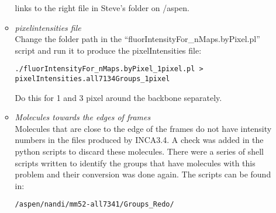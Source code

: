 \documentclass[11pt]{article}
\begin{document}
\begin{enumerate}
\begin{itemize}
\begin{verbatim}
\end{verbatim}
links to the right file in Steve's folder on /aspen.
\item \emph{pixelintensities file} \\
Change the folder path in the ``fluorIntensityFor\_nMaps.byPixel.pl'' script and run it to produce the pixelIntensities file:
\begin{verbatim}
./fluorIntensityFor_nMaps.byPixel_1pixel.pl > pixelIntensities.all7134Groups_1pixel
\end{verbatim}
Do this for 1 and 3 pixel around the backbone separately. 
\item \emph{Molecules towards the edges of frames} \\
Molecules that are close to the edge of the frames do not have intensity numbers in the files produced by INCA3.4. A check was added in the python scripts to discard these molecules. There were a series of shell scripts written to identify the groups that have molecules with this problem and their conversion was done again. The scripts can be found in:
\begin{verbatim}
/aspen/nandi/mm52-all7341/Groups_Redo/
\end{verbatim}

\end{itemize}
\end{enumerate}
\end{document}

